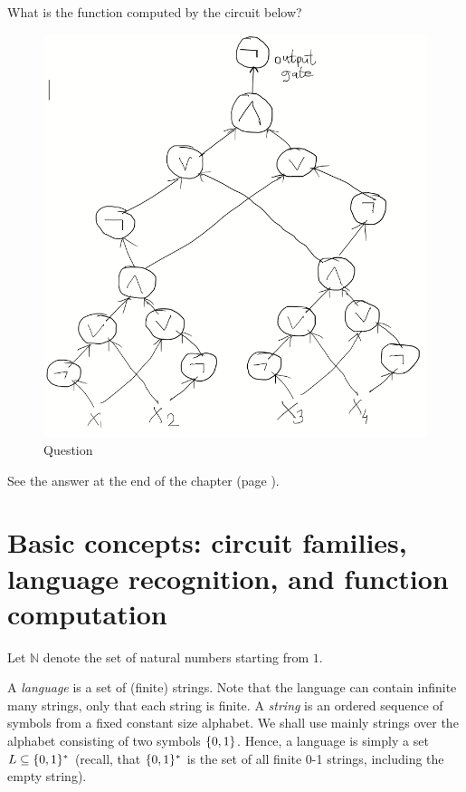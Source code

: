  
\begin{myquestion}{What is the function computed by the circuit below?}
\label{quest:1}
\begin{figure}
    \centering
    \includegraphics[width=0.75\linewidth]{images/parity-circuit-question.png}
    \caption{Question}
    \label{fig:enter-label}
\end{figure}
\end{myquestion}
 
See the answer at the  end of the chapter (page \pageref{trailer:xor-circuit}).



\section{Basic concepts: circuit families, language recognition, and function computation}

Let $\mathbb{N}$ denote the set of natural numbers starting from $1$.



A \emph{language} is a set of (finite) strings. Note that the language can contain infinite many strings, only that each string is finite. A \emph{string} is an ordered sequence of symbols from a fixed constant size alphabet. We shall use mainly strings over the alphabet consisting of two symbols $\{0,1\}$.
Hence, a language is simply a set $L\subseteq\{0,1\}^*$ (recall, that $\{0,1\}^*$ is the set of all finite 0-1 strings, including the empty string). 
 

